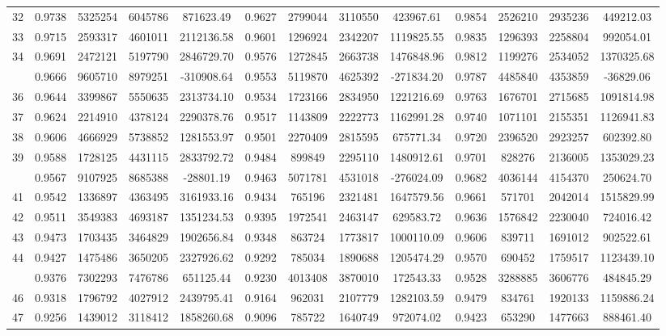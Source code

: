 \documentclass[
  12pt,
]{article}
\begin{document}
\begin{longtable}[t]{lcccccccccccc}
32 & 0.9738 & 5325254 & 6045786 & 871623.49 & 0.9627 & 2799044 & 3110550 & 423967.61 & 0.9854 & 2526210 & 2935236 & 449212.03\\
33 & 0.9715 & 2593317 & 4601011 & 2112136.58 & 0.9601 & 1296924 & 2342207 & 1119825.55 & 0.9835 & 1296393 & 2258804 & 992054.01\\
34 & 0.9691 & 2472121 & 5197790 & 2846729.70 & 0.9576 & 1272845 & 2663738 & 1476848.96 & 0.9812 & 1199276 & 2534052 & 1370325.68\\
\addlinespace
35 & 0.9666 & 9605710 & 8979251 & -310908.64 & 0.9553 & 5119870 & 4625392 & -271834.20 & 0.9787 & 4485840 & 4353859 & -36829.06\\
36 & 0.9644 & 3399867 & 5550635 & 2313734.10 & 0.9534 & 1723166 & 2834950 & 1221216.69 & 0.9763 & 1676701 & 2715685 & 1091814.98\\
37 & 0.9624 & 2214910 & 4378124 & 2290378.76 & 0.9517 & 1143809 & 2222773 & 1162991.28 & 0.9740 & 1071101 & 2155351 & 1126941.83\\
38 & 0.9606 & 4666929 & 5738852 & 1281553.97 & 0.9501 & 2270409 & 2815595 & 675771.34 & 0.9720 & 2396520 & 2923257 & 602392.80\\
39 & 0.9588 & 1728125 & 4431115 & 2833792.72 & 0.9484 & 899849 & 2295110 & 1480912.61 & 0.9701 & 828276 & 2136005 & 1353029.23\\
\addlinespace
40 & 0.9567 & 9107925 & 8685388 & -28801.19 & 0.9463 & 5071781 & 4531018 & -276024.09 & 0.9682 & 4036144 & 4154370 & 250624.70\\
41 & 0.9542 & 1336897 & 4363495 & 3161933.16 & 0.9434 & 765196 & 2321481 & 1647579.56 & 0.9661 & 571701 & 2042014 & 1515829.99\\
42 & 0.9511 & 3549383 & 4693187 & 1351234.53 & 0.9395 & 1972541 & 2463147 & 629583.72 & 0.9636 & 1576842 & 2230040 & 724016.42\\
43 & 0.9473 & 1703435 & 3464829 & 1902656.84 & 0.9348 & 863724 & 1773817 & 1000110.09 & 0.9606 & 839711 & 1691012 & 902522.61\\
44 & 0.9427 & 1475486 & 3650205 & 2327926.62 & 0.9292 & 785034 & 1890688 & 1205474.29 & 0.9570 & 690452 & 1759517 & 1123439.10\\
\addlinespace
45 & 0.9376 & 7302293 & 7476786 & 651125.44 & 0.9230 & 4013408 & 3870010 & 172543.33 & 0.9528 & 3288885 & 3606776 & 484845.29\\
46 & 0.9318 & 1796792 & 4027912 & 2439795.41 & 0.9164 & 962031 & 2107779 & 1282103.59 & 0.9479 & 834761 & 1920133 & 1159886.24\\
47 & 0.9256 & 1439012 & 3118412 & 1858260.68 & 0.9096 & 785722 & 1640749 & 972074.02 & 0.9423 & 653290 & 1477663 & 888461.40\\

\end{longtable}
\end{document}
